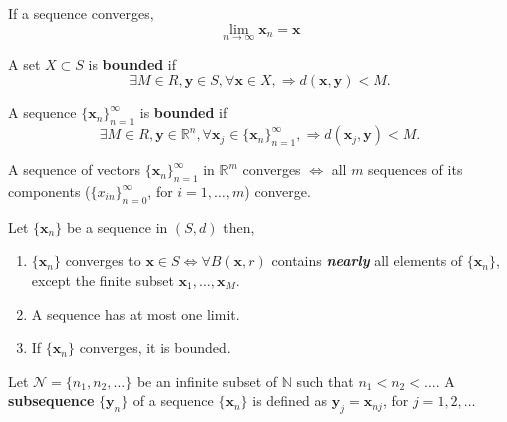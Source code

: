 \begin{definition} If a sequence converges,
    \begin{equation*}
        \lim_{n \to \infty} \mathbf{x}_n = \mathbf{x}
    \end{equation*}
\end{definition}

\begin{definition}
    A set $X \subset S$ is \textbf{bounded} if \begin{equation*}
        \exists M \in R, \mathbf{y} \in S, \forall \mathbf{x} \in X, \Rightarrow d(\mathbf{x},\mathbf{y}) < M.
    \end{equation*}
\end{definition}

\begin{definition}
    A sequence $\{{\mathbf{x}_n}\}_{n=1}^{\infty}$ is \textbf{bounded} if \begin{equation*}
        \exists M \in R, \mathbf{y} \in \mathbb{R}^{n}, \forall \mathbf{x}_j \in \{{\mathbf{x}_n}\}_{n=1}^{\infty}, \Rightarrow d(\mathbf{x}_j,\mathbf{y}) < M.
    \end{equation*}
\end{definition}

\begin{proposition}
    A sequence of vectors $\{{\mathbf{x}_n}\}_{n=1}^{\infty}$ in $\mathbb{R}^{m}$ converges $\iff$ all $m$ sequences of its components ($\{x_{in}\}_{n=0}^{\infty }$, for $i=1,\dots,m$) converge.
\end{proposition}


\begin{proposition} Let $\{\mathbf{x}_n\}$ be a sequence in $(S,d)$ then,
    \begin{enumerate}
        \item $\{\mathbf{x}_{n}\}$ converges to $\mathbf{x} \in S \iff \forall B(\mathbf{x},r)$ contains \textit{\textbf{nearly}} all elements of  $\{\mathbf{x}_{n}\}$, except the finite subset $\mathbf{x}_1,\dots,\mathbf{x}_M$.
        \item A sequence has at most one limit.
        \item If $\{\mathbf{x}_{n}\}$ converges, it is bounded.
    \end{enumerate}
\end{proposition}

\begin{definition}[Subsequence]
    Let $\mathcal{N} = \{n_1, n_2, \dots\}$ be an infinite subset of $\mathbb{N}$ such that $n_1 < n_2 < \dots$. A \textbf{subsequence} $\{\mathbf{y}_n\}$ of a sequence $\{\mathbf{x}_n\}$ is defined as $\mathbf{y}_j = \mathbf{x}_{nj}$, for $j=1,2,\dots$
\end{definition}

